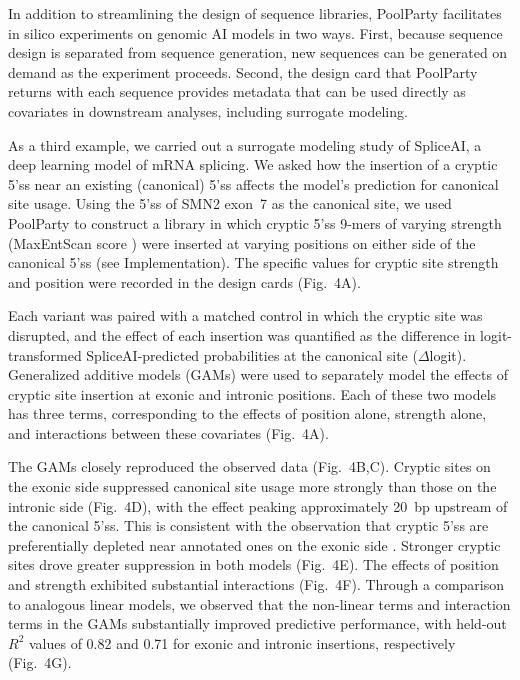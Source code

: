 \documentclass[pdflatex,sn-vancouver-num,referee,oneside]{sn-jnl}
\newif\ifshowquoted
\newcommand{\quoted}[1]{\ifshowquoted\textcolor{quotedtext}{#1}\else#1\fi}
\begin{document}
In addition to streamlining the design of sequence libraries, PoolParty facilitates in silico experiments on genomic AI models in two ways. First, because sequence design is separated from sequence generation, new sequences can be generated on demand as the experiment proceeds. Second, the design card that PoolParty returns with each sequence provides metadata that can be used directly as covariates in downstream analyses, including surrogate modeling.

As a third example, we carried out a surrogate modeling study of SpliceAI, a deep learning model of mRNA splicing. We asked how the insertion of a cryptic 5'ss near an existing (canonical) 5'ss affects the model's prediction for canonical site usage. \quoted{Using the 5'ss of SMN2 exon~7 as the canonical site, we used PoolParty to construct a library in which cryptic 5'ss 9-mers of varying strength (MaxEntScan score \citep{Yeo2004me}) were inserted at varying positions on either side of the canonical 5'ss (see Implementation).} The specific values for cryptic site strength and position were recorded in the design cards (Fig.~4A).

Each variant was paired with a matched control in which the cryptic site was disrupted, and the effect of each insertion was quantified as the difference in logit-transformed SpliceAI-predicted probabilities at the canonical site ($\Delta$logit). Generalized additive models (GAMs) were used to separately model the effects of cryptic site insertion at exonic and intronic positions. Each of these two models has three terms, corresponding to the effects of position alone, strength alone, and interactions between these covariates (Fig.~4A).

The GAMs closely reproduced the observed data (Fig.~4B,C). Cryptic sites on the exonic side suppressed canonical site usage more strongly than those on the intronic side (Fig.~4D), with the effect peaking approximately 20~bp upstream of the canonical 5'ss. This is consistent with the observation that cryptic 5'ss are preferentially depleted near annotated ones on the exonic side \citep{Dawes2022empirical}. Stronger cryptic sites drove greater suppression in both models (Fig.~4E). The effects of position and strength exhibited substantial interactions (Fig.~4F). Through a comparison to analogous linear models, we observed that the non-linear terms and interaction terms in the GAMs substantially improved predictive performance, with held-out $R^2$ values of 0.82 and 0.71 for exonic and intronic insertions, respectively (Fig.~4G).
\end{document}
